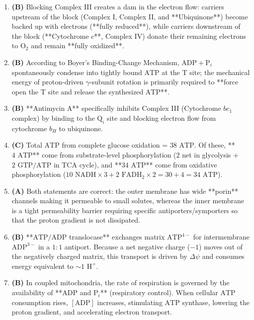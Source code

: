 \documentclass[11pt, a4paper]{article}
\begin{document}
\begin{enumerate}[label=\textbf{\arabic*.}]
\item \textbf{(B)} Blocking Complex III creates a dam in the electron flow: carriers upstream of the block (Complex I, Complex II, and **Ubiquinone**) become backed up with electrons (**fully reduced**), while carriers downstream of the block (**Cytochrome $c$**, Complex IV) donate their remaining electrons to $\text{O}_2$ and remain **fully oxidized**.

\item \textbf{(B)} According to Boyer's Binding-Change Mechanism, $\text{ADP} + \text{P}_i$ spontaneously condense into tightly bound $\text{ATP}$ at the $\text{T}$ site; the mechanical energy of proton-driven $\gamma$-subunit rotation is primarily required to **force open the $\text{T}$ site and release the synthesized $\text{ATP}$**.

\item \textbf{(B)} **Antimycin A** specifically inhibits Complex III (Cytochrome $bc_1$ complex) by binding to the $\text{Q}_i$ site and blocking electron flow from cytochrome $b_H$ to ubiquinone.

\item \textbf{(C)} Total $\text{ATP}$ from complete glucose oxidation = $38\text{ ATP}$. Of these, **$4\text{ ATP}$** come from substrate-level phosphorylation ($2$ net in glycolysis + $2\text{ GTP}/\text{ATP}$ in TCA cycle), and **$34\text{ ATP}$** come from oxidative phosphorylation ($10\text{ NADH} \times 3 + 2\text{ FADH}_2 \times 2 = 30 + 4 = 34\text{ ATP}$).

\item \textbf{(A)} Both statements are correct: the outer membrane has wide **porin** channels making it permeable to small solutes, whereas the inner membrane is a tight permeability barrier requiring specific antiporters/symporters so that the proton gradient is not dissipated.

\item \textbf{(B)} **$\text{ATP}/\text{ADP}$ translocase** exchanges matrix $\text{ATP}^{4-}$ for intermembrane $\text{ADP}^{3-}$ in a $1:1$ antiport. Because a net negative charge ($-1$) moves out of the negatively charged matrix, this transport is driven by $\Delta \psi$ and consumes energy equivalent to $\sim 1\text{ H}^+$.

\item \textbf{(B)} In coupled mitochondria, the rate of respiration is governed by the availability of **$\text{ADP}$ and $\text{P}_i$** (respiratory control). When cellular $\text{ATP}$ consumption rises, $[\text{ADP}]$ increases, stimulating $\text{ATP}$ synthase, lowering the proton gradient, and accelerating electron transport.


\end{enumerate}
\end{document}
